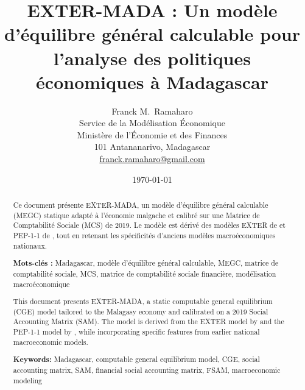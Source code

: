 \documentclass[11pt,a4paper]{article}
\title{EXTER-MADA : Un modèle d'équilibre général calculable pour l'analyse des politiques économiques à Madagascar}
\author{Franck M.~Ramaharo\orcidlink{0000-0003-0340-170X}\\
	\small Service de la Modélisation Économique\\
	\small Ministère de l'Économie et des Finances\\ 
	\small 101 Antananarivo, Madagascar\\
	\small\href{mailto:franck.ramaharo@gmail.com}{\sffamily franck.ramaharo@gmail.com}\\
}
\date{\today}
\begin{document}
	\maketitle
	
	
	\begin{abstract}
		Ce document présente EXTER-MADA, un modèle d’équilibre général calculable (MEGC) statique adapté à l’économie malgache et calibré sur une Matrice de Comptabilité Sociale (MCS) de 2019. Le modèle est dérivé des modèles EXTER de \cite{Decaluweetal2001} et PEP-1-1 de \cite{Decaluweetal2013}, tout en retenant les spécificités d'anciens modèles macroéconomiques nationaux.  
		
		\bigskip
		
		\textbf{Mots-clés :} Madagascar, modèle d’équilibre général calculable, MEGC, matrice de comptabilité sociale, MCS, matrice de comptabilité sociale financière, modélisation macroéconomique
	\end{abstract}	
	
	
	\begin{abstract}
		
		This document presents EXTER-MADA, a static computable general equilibrium (CGE) model tailored to the Malagasy economy and calibrated on a 2019 Social Accounting Matrix (SAM). The model is derived from the EXTER model by \cite{Decaluweetal2001} and the PEP-1-1 model by \cite{Decaluweetal2013}, while incorporating specific features from earlier national macroeconomic models.
		
		\bigskip
		
		\textbf{Keywords:} Madagascar,  computable general equilibrium model, CGE, social accounting matrix, SAM, financial social accounting matrix, FSAM,  macroeconomic modeling
	\end{abstract}
	
\end{document}
